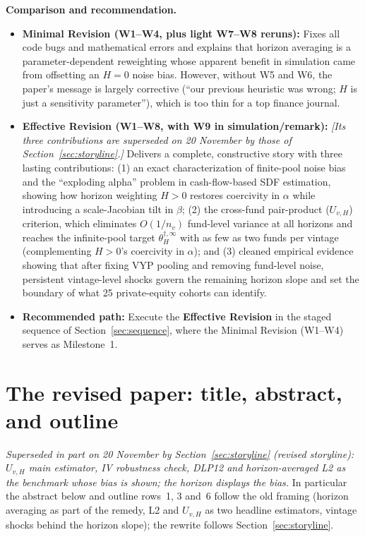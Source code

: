 \documentclass[11pt]{article}
\begin{document}
\textbf{Comparison and recommendation.}
\begin{itemize}
\item \textbf{Minimal Revision (W1--W4, plus light W7--W8 reruns):} Fixes all code bugs and mathematical errors and explains that horizon averaging is a parameter-dependent reweighting whose apparent benefit in simulation came from offsetting an $H=0$ noise bias. However, without W5 and W6, the paper's message is largely corrective (``our previous heuristic was wrong; $H$ is just a sensitivity parameter''), which is too thin for a top finance journal.
\item \textbf{Effective Revision (W1--W8, with W9 in simulation/remark):} \emph{[Its three contributions are superseded on 20 November by those of Section~\ref{sec:storyline}.]} Delivers a complete, constructive story with three lasting contributions: (1) an exact characterization of finite-pool noise bias and the ``exploding alpha'' problem in cash-flow-based SDF estimation, showing how horizon weighting $H>0$ restores coercivity in $\alpha$ while introducing a scale-Jacobian tilt in $\beta$; (2) the cross-fund pair-product ($U_{v,H}$) criterion, which eliminates $O(1/n_v)$ fund-level variance at all horizons and reaches the infinite-pool target $\theta_H^{\dagger,\infty}$ with as few as two funds per vintage (complementing $H>0$'s coercivity in $\alpha$); and (3) cleaned empirical evidence showing that after fixing VYP pooling and removing fund-level noise, persistent vintage-level shocks govern the remaining horizon slope and set the boundary of what 25 private-equity cohorts can identify.
\item \textbf{Recommended path:} Execute the \textbf{Effective Revision} in the staged sequence of Section~\ref{sec:sequence}, where the Minimal Revision (W1--W4) serves as Milestone~1.
\end{itemize}

\section{The revised paper: title, abstract, and outline}
\label{sec:outline}

\emph{Superseded in part on 20 November by Section~\ref{sec:storyline} (revised storyline): $U_{v,H}$ main estimator, IV robustness check, DLP12 and horizon-averaged L2 as the benchmark whose bias is shown; the horizon displays the bias.} In particular the abstract below and outline rows~1, 3 and~6 follow the old framing (horizon averaging as part of the remedy, L2 and $U_{v,H}$ as two headline estimators, vintage shocks behind the horizon slope); the rewrite follows Section~\ref{sec:storyline}.
\end{document}
